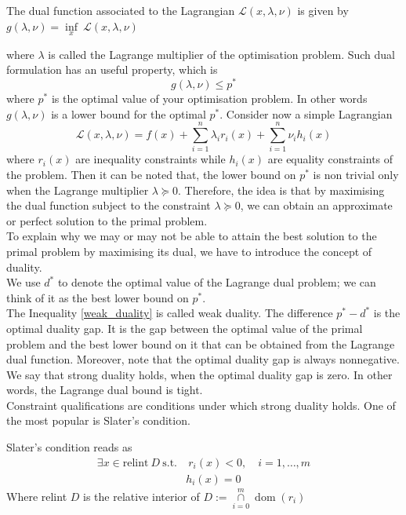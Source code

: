 \begin{definition}
    The dual function associated to the Lagrangian $\mathcal{L}(x,\lambda, \nu)$ is given by $g(\lambda, \nu)=\underset{x}\inf \ \mathcal{L}(x,\lambda, \nu)$
\end{definition}
where $\lambda$ is called the Lagrange multiplier of the optimisation problem. Such dual formulation has an useful property, which is \begin{equation}\label{weak_duality}
    g(\lambda, \nu)\leq p^*
\end{equation}
where $p^*$ is the optimal value of your optimisation problem. In other words $g(\lambda, \nu)$ is a lower bound for the optimal $p^*$.
Consider now a simple Lagrangian $$\mathcal{L}(x,\lambda, \nu)=f(x)+\sum\limits_{i=1}^n \lambda_i r_i(x) +\sum\limits_{i=1}^{n} \nu_i h_i(x)$$
where $r_i(x)$ are inequality constraints while $h_i(x)$ are equality constraints of the problem. Then it can be noted that, the lower bound on $p^*$ is non trivial only when the Lagrange multiplier $\lambda \succeq 0$.
Therefore, the idea is that by maximising the dual function subject to the constraint $\lambda \succeq 0$, we can obtain an approximate or perfect solution to the primal problem.
\\
To explain why we may or may not be able to attain the best solution to the primal problem by maximising its dual, we have to introduce the concept of duality.
\\
We use $d^*$ to denote the optimal value of the Lagrange dual problem; we can think of it as the best lower bound on $p^*$. 
\\
The Inequality \ref{weak_duality} is called weak duality. The difference $p^*-d^*$ is the optimal duality gap. It is the gap between the optimal value of the primal problem and the best lower bound on it that can be obtained from the Lagrange dual function. Moreover, note that the optimal duality gap is always nonnegative.
We say that strong duality holds, when the optimal duality gap is zero. In other words, the Lagrange dual bound is tight.
\\
Constraint qualifications are conditions under which strong duality holds. One of the most popular is Slater's condition.
\begin{proposition}
    Slater's condition reads as
    \begin{equation}\label{slater_condition}
        \begin{aligned}
            \exists x \in \textrm{relint} \ D \ \textrm{s.t.} & \ r_i(x)<0, \quad i=1, \dots, m \\
            & h_i(x)=0
        \end{aligned}
    \end{equation}
    Where relint $D$ is the relative interior of $ D:=\underset{i=0}{\overset{m}{\cap}} \operatorname {dom} (r_{i})$
\end{proposition}
